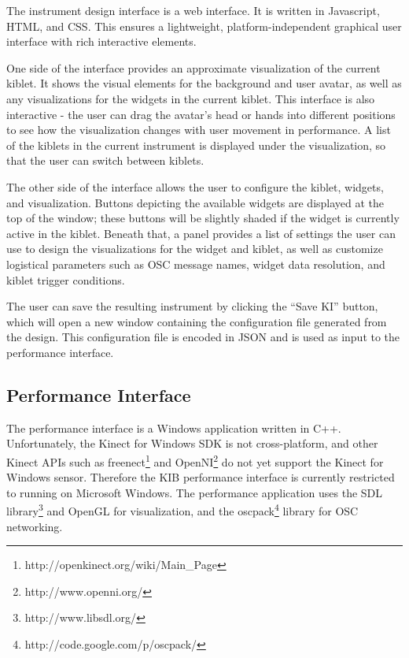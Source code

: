 \documentclass{nime-alternate}
\begin{document}
The instrument design interface is a web interface. It is written in Javascript,
HTML, and CSS. This ensures a lightweight, platform-independent graphical user interface
with rich interactive elements.

One side of the interface provides an approximate visualization of the current kiblet. It shows the visual
elements for the background and user avatar, as well as any visualizations for the widgets
in the current kiblet. This interface is also interactive - the user can drag the avatar's head or hands
into different positions to see how the visualization changes with user movement in performance. A list of the kiblets in the current instrument is displayed under the visualization, so
that the user can switch between kiblets.

The other side of the interface allows the user to configure the kiblet, widgets, and visualization.
Buttons depicting the available widgets are displayed at the top of the window; these buttons will be
slightly shaded if the widget is currently active in the kiblet. Beneath that, a panel provides a list of
settings the user can use to design the visualizations for the widget and kiblet, as well as customize logistical
parameters such as OSC message names, widget data resolution, and kiblet trigger conditions.

The user can save the resulting instrument by clicking the ``Save KI'' button, which will open
a new window containing the configuration file generated from the design. This configuration
file is encoded in JSON and is used as input to the performance interface.
\subsection{Performance Interface}
The performance interface is a Windows application written in C++. Unfortunately, the Kinect
for Windows SDK is not cross-platform, and other Kinect APIs such as freenect\footnote{http://openkinect.org/wiki/Main\_Page} and OpenNI\footnote{http://www.openni.org/} do not yet support
the Kinect for Windows sensor. Therefore the KIB performance interface is currently restricted
to running on Microsoft Windows. The performance application uses the SDL library\footnote{http://www.libsdl.org/} and OpenGL
for visualization, and the oscpack\footnote{http://code.google.com/p/oscpack/} library for
OSC networking. 
\end{document}
